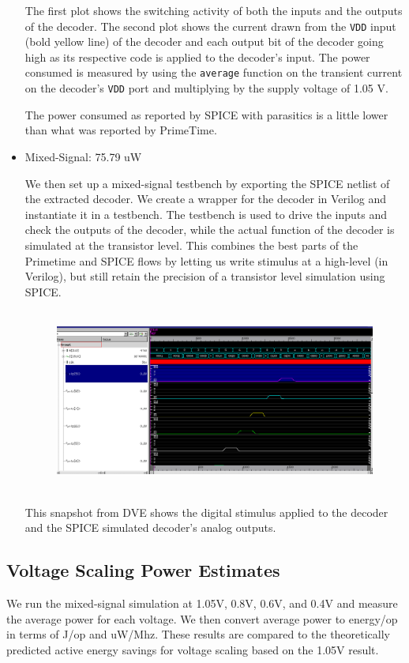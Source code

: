 \documentclass[11pt]{article}
\begin{document}
\begin{itemize}
	The first plot shows the switching activity of both the inputs and the outputs of the decoder. The second plot shows the current drawn from the \verb|VDD| input (bold yellow line) of the decoder and each output bit of the decoder going high as its respective code is applied to the decoder's input. The power consumed is measured by using the \verb|average| function on the transient current on the decoder's \verb|VDD| port and multiplying by the supply voltage of 1.05 V.
	
	The power consumed as reported by SPICE with parasitics is a little lower than what was reported by PrimeTime.
	
	\item Mixed-Signal: 75.79 uW
	
	We then set up a mixed-signal testbench by exporting the SPICE netlist of the extracted decoder. We create a wrapper for the decoder in Verilog and instantiate it in a testbench. The testbench is used to drive the inputs and check the outputs of the decoder, while the actual function of the decoder is simulated at the transistor level. This combines the best parts of the Primetime and SPICE flows by letting us write stimulus at a high-level (in Verilog), but still retain the precision of a transistor level simulation using SPICE.
	
	\begin{figure}[H]
		\centerline{\includegraphics[height=6cm]{mixed_signal_power_analysis.png}}
	\end{figure}

	This snapshot from DVE shows the digital stimulus applied to the decoder and the SPICE simulated decoder's analog outputs.
\end{itemize}

\subsection{Voltage Scaling Power Estimates}
We run the mixed-signal simulation at 1.05V, 0.8V, 0.6V, and 0.4V and measure the average power for each voltage. We then convert average power to energy/op in terms of J/op and uW/Mhz. These results are compared to the theoretically predicted active energy savings for voltage scaling based on the 1.05V result.
\end{document}
